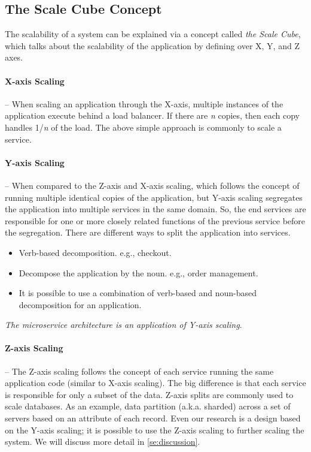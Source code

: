 \subsection{The Scale Cube Concept}
\label{subse:scale_cube}

The scalability of a system can be explained via a concept called \emph{the Scale Cube}, which talks about the scalability of the application by defining over X, Y, and Z axes.

\paragraph{X-axis Scaling}-- When scaling an application through the X-axis, multiple instances of the application execute behind a load balancer. If there are \textit{n} copies, then each copy handles 1/\textit{n} of the load. The above simple approach is commonly to scale a service.

\paragraph{Y-axis Scaling}-- When compared to the Z-axis and X-axis scaling, which follows the concept of running multiple identical copies of the application, but Y-axis scaling segregates the application into multiple services in the same domain. So, the end services are responsible for one or more closely related functions of the previous service before the segregation. There are different ways to split the application into services.
\begin{itemize}
    \item Verb-based decomposition. e.g., checkout.
    \item Decompose the application by the noun. e.g., order management.
    \item It is possible to use a combination of verb-based and noun-based decomposition for an application.
\end{itemize}
\emph{The microservice architecture is an application of Y-axis scaling}.

\paragraph{Z-axis Scaling}-- The Z-axis scaling follows the concept of each service running the same application code (similar to X-axis scaling). The big difference is that each service is responsible for only a subset of the data. Z-axis splits are commonly used to scale databases. As an example, data partition (a.k.a. sharded) across a set of servers based on an attribute of each record.
Even our research is a design based on the Y-axis scaling; it is possible to use the Z-axis scaling to further scaling the system. We will discuss more detail in \cref{se:discussion}.


